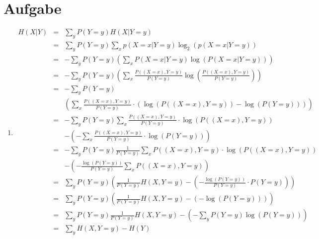\documentclass[DIN, pagenumber=false, fontsize=11pt, parskip=half]{scrartcl}
\begin{document}
    \section{Aufgabe}
    \begin{enumerate}[label=\alph*)]
        \item 
            \begin{eqnarray*}
                H(X|Y) &=& \sum_y P(Y=y) H(X|Y=y) \\
                       &=& \sum_y P(Y=y) \sum_x p(X=x|Y=y) \log_2\left(p(X=x|Y=y)\right) \\
                       &=& -\sum_y P(Y=y)\left( \sum_{x} P(X=x|Y=y) \log\left(P(X=x|Y=y)\right)\right) \\
                       &=& -\sum_y P(Y=y) \left(\sum_{x} \frac{P((X=x), Y=y)}{P(Y=y)} 
                                \log\left(\frac{P((X=x), Y=y)}{P(Y=y)}\right) \right)\\
                       &=& -\sum_y P(Y=y) \\
                            &&\left(\sum_{x} \frac{P((X=x), Y=y)}{P(Y=y)} \cdot
                            \left(\log\left(P((X=x), Y=y)\right) -\log\left(P(Y=y)\right)\right)\right)\\
                       &=& -\sum_y P(Y=y) \sum_{x} \frac{P((X=x), Y=y)}{P(Y=y)} \cdot
                            \log\left(P((X=x), Y=y)\right) \\
                            &&- \left(-\sum_{x} \frac{P((X=x), Y=y)}{P(Y=y)} 
                            \cdot \log\left(P(Y=y)\right)\right)\\
                       &=& -\sum_y P(Y=y) \frac{1}{P(Y=y)} \sum_{x} P((X=x), Y=y) \cdot
                            \log\left(P((X=x), Y=y)\right) \\
                            &&- \left(- \frac{\log\left(P(Y=y)\right)}{P(Y=y)} 
                            \sum_{x} P((X=x), Y=y)\right) \\
                       &=& \sum_y P(Y=y)\left(\frac{1}{P(Y=y)} H(X,Y=y) - \left(- \frac{\log\left(P(Y=y)\right)}{P(Y=y)} \cdot P(Y=y) \right)\right)\\
                       &=& \sum_y P(Y=y) \left(\frac{1}{P(Y=y)} H(X,Y=y) - \left(- \log\left(P(Y=y)\right) \right)\right)\\
                       &=& \sum_y P(Y=y) \frac{1}{P(Y=y)} H(X,Y=y) - \left(- \sum_y P(Y=y) \log\left(P(Y=y)\right) \right)\\
                       &=& \sum_y H(X,Y=y) - H(Y)\\

\end{eqnarray*}
\end{enumerate}
\end{document}
